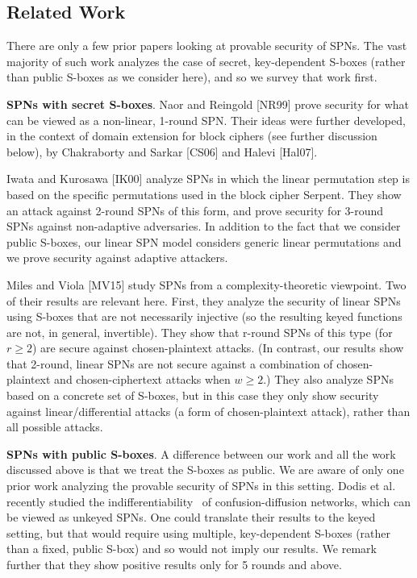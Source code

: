 \subsection{Related Work}


There are only a few prior papers looking at provable security of SPNs. The vast
majority of such work analyzes the case of secret, key-dependent S-boxes (rather
than public S-boxes as we consider here), and so we survey that work first.



{\bf SPNs with secret S-boxes}. Naor and Reingold [NR99] prove security for
what can be viewed as a non-linear, 1-round SPN. Their ideas were further
developed, in the context of domain extension for block ciphers (see further
discussion below), by Chakraborty and Sarkar [CS06] and Halevi [Hal07].


Iwata and Kurosawa [IK00] analyze SPNs in which the linear permutation
step is based on the specific permutations used in the block cipher Serpent. They
show an attack against 2-round SPNs of this form, and prove security for 3-round
SPNs against non-adaptive adversaries. In addition to the fact that we consider
public S-boxes, our linear SPN model considers generic linear permutations and
we prove security against adaptive attackers.

Miles and Viola [MV15] study SPNs from a complexity-theoretic viewpoint.
Two of their results are relevant here. First, they analyze the security of linear
SPNs using S-boxes that are not necessarily injective (so the resulting keyed
functions are not, in general, invertible). They show that r-round SPNs of this
type (for $r\geq 2$) are secure against chosen-plaintext attacks. (In contrast, our
results show that 2-round, linear SPNs are not secure against a combination of
chosen-plaintext and chosen-ciphertext attacks when $w\geq 2$.) They also analyze
SPNs based on a concrete set of S-boxes, but in this case they only show security
against linear/differential attacks (a form of chosen-plaintext attack), rather
than all possible attacks.


{\bf SPNs with public S-boxes}. A difference between our work and all the work
discussed above is that we treat the S-boxes as public. We are aware of only
one prior work analyzing the provable security of SPNs in this setting. Dodis
et al.~\cite{EC:DSSL16} recently studied the indifferentiability~\cite{TCC:MauRenHol04} of confusion-diffusion
networks, which can be viewed as unkeyed SPNs. One could translate
their results to the keyed setting, but that would require using multiple, key-dependent
S-boxes (rather than a fixed, public S-box) and so would not imply
our results. We remark further that they show positive results only for 5 rounds
and above.


